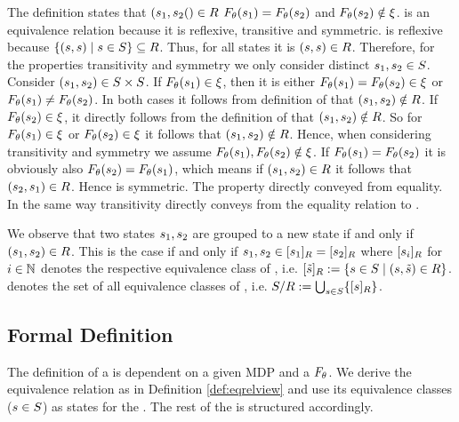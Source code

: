 \documentclass[preview]{standalone}
\begin{document}
The definition states that $({s}_1, {s}_2() \in {R}$ \iffN ${F_{{\theta}}}({s}_1) = {F_{{\theta}}}({s}_2)$ and ${F_{{\theta}}}({s}_2) \notin {\xi}$. \eqrelview is an equivalence relation because it is reflexive, transitive and symmetric. \eqrelview is reflexive because $\{({s}, {s})  \mid {s} \in {S}\} \subseteq {R}$. Thus, for all states \state it is $({s}, {s}) \in {R}$. Therefore, for the properties transitivity and symmetry we only consider distinct ${s}_1, {s}_2 \in {S}$. Consider $({s}_1, {s}_2) \in {S} \times {S}$. If ${F_{{\theta}}}({s}_1) \in {\xi}$, then it is either ${F_{{\theta}}}({s}_1) = {F_{{\theta}}}({s}_2) \in {\xi}$ or ${F_{{\theta}}}({s}_1) \neq {F_{\ensuremath{{\theta}}}}({s}_2)$. In both cases it follows from definition of \eqrelview that $({s}_1, {s}_2) \notin {R}$. If ${F_{{\theta}}}({s}_2) \in {\xi}$, it directly follows from the definition of \eqrelview that $({s}_1, {s}_2) \notin {R}$. So for  ${F_{{\theta}}}({s}_1) \in {\xi}$ or  ${F_{{\theta}}}({s}_2) \in {\xi}$ it follows that $({s}_1, {s}_2) \notin {R}$. Hence, when considering transitivity and symmetry we assume ${F_{{\theta}}}({s}_1), {F_{{\theta}}}({s}_2) \notin {\xi}$. If ${F_{{\theta}}}({s}_1) = {F_{{\theta}}}({s}_2)$ it is obviously also ${F_{{\theta}}}({s}_2) = {F_{{\theta}}}({s}_1)$, which means if $({s}_1, {s}_2) \in {R}$ it follows that $({s}_2, {s}_1) \in {R}$. Hence \eqrelview is symmetric. The property directly conveyed from equality. In the same way transitivity directly conveys from the equality relation to \eqrelview.

We observe that two states ${s}_1, {s}_2$ are grouped to a new state if and only if $({s}_1, {s}_2) \in {R}$. This is the case if and only if ${s}_1, {s}_2 \in {\ensuremath{{[{s}_1]_{{R}}}}} = {{[{s}_2]_{{R}}}}$ where ${{[{s}_i]_{{R}}}}$ for $i \in {\mathbb{N}}$ denotes the respective equivalence class of \eqrelview, i.e. ${{[{\tilde{{s}}}]_{{R}}}} := \{{s} \in {S} \mid ({s},{\tilde{{s}}}) \in {R}\}$. \eqclasssetv denotes the set of all equivalence classes of \eqrelview, i.e. ${{{S}}/{R}} := \bigcup_{{s} \in {S}}\{{{[{s}]_{{R}}}}\}$.

\subsection{Formal Definition}

The definition of a \viewN is dependent on a given MDP and a \grpfctN ${F_{{\theta}}}$. We derive the equivalence relation \eqrelview as in Definition \ref{def:eqrelview} and use its equivalence classes \eqclassv (${s} \in {S}$) as states for the \viewN. The rest of the \chgphN is structured accordingly.
\end{document}
